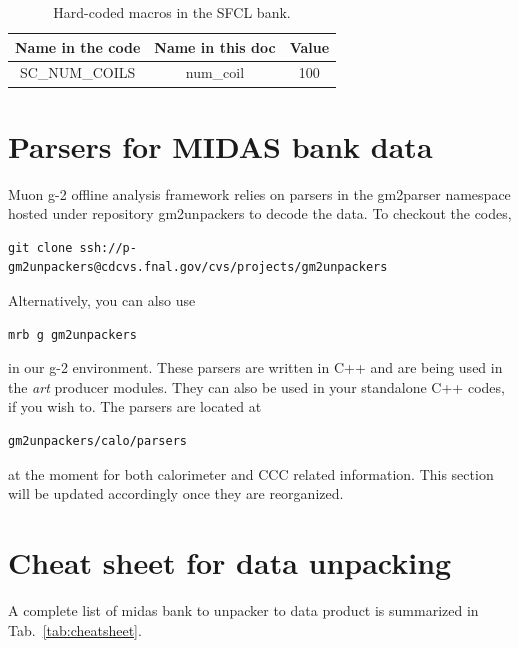 \begin{table}[htbp]
\centering
\caption{Hard-coded macros in the SFCL bank.}
\begin{tabular}{|c|c|c|}
\hline
Name in the code    & Name in this doc & Value \\
\hline
SC\_NUM\_COILS &  num\_coil & 100 \\
\hline
\end{tabular} 
\label{tab:sfclmacro}
\end{table}

\newpage
\section{Parsers for MIDAS bank data}
Muon g-2 offline analysis framework relies on parsers in the gm2parser namespace hosted under repository gm2unpackers to decode the data. To checkout the codes, 

\begin{Verbatim}[frame=single]
git clone ssh://p-gm2unpackers@cdcvs.fnal.gov/cvs/projects/gm2unpackers
\end{Verbatim}
%
Alternatively, you can also use 
\begin{Verbatim}[frame=single]
mrb g gm2unpackers
\end{Verbatim}
in our g-2 environment.
%
These parsers are written in C++ and are being used in the \textit{art} producer modules. They can also be used in your standalone C++ codes, if you wish to. The parsers are located at
%
\begin{Verbatim}[frame=single]
gm2unpackers/calo/parsers
\end{Verbatim}
at the moment for both calorimeter and CCC related information. This section will be updated accordingly once they are reorganized.


\section{Cheat sheet for data unpacking}\label{sec:cheatsheet}

A complete list of midas bank to unpacker to data product is summarized in Tab.~\ref{tab:cheatsheet}. 

